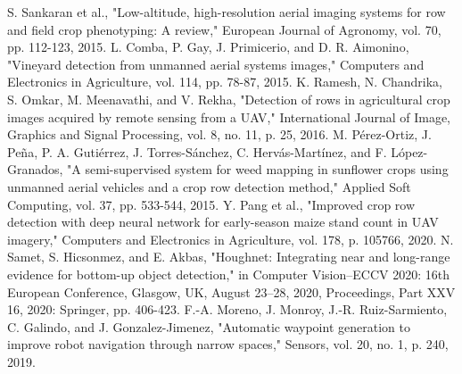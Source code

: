 \documentclass[conference]{IEEEtran}
\begin{document}
\begin{thebibliography}{00}
		 S. Sankaran et al., "Low-altitude, high-resolution aerial imaging systems for row and field crop phenotyping: A review," European Journal of Agronomy, vol. 70, pp. 112-123, 2015.
		 L. Comba, P. Gay, J. Primicerio, and D. R. Aimonino, "Vineyard detection from unmanned aerial systems images," Computers and Electronics in Agriculture, vol. 114, pp. 78-87, 2015.
		 K. Ramesh, N. Chandrika, S. Omkar, M. Meenavathi, and V. Rekha, "Detection of rows in agricultural crop images acquired by remote sensing from a UAV," International Journal of Image, Graphics and Signal Processing, vol. 8, no. 11, p. 25, 2016.
		 M. Pérez-Ortiz, J. Peña, P. A. Gutiérrez, J. Torres-Sánchez, C. Hervás-Martínez, and F. López-Granados, "A semi-supervised system for weed mapping in sunflower crops using unmanned aerial vehicles and a crop row detection method," Applied Soft Computing, vol. 37, pp. 533-544, 2015.
		 Y. Pang et al., "Improved crop row detection with deep neural network for early-season maize stand count in UAV imagery," Computers and Electronics in Agriculture, vol. 178, p. 105766, 2020.
		 N. Samet, S. Hicsonmez, and E. Akbas, "Houghnet: Integrating near and long-range evidence for bottom-up object detection," in Computer Vision–ECCV 2020: 16th European Conference, Glasgow, UK, August 23–28, 2020, Proceedings, Part XXV 16, 2020: Springer, pp. 406-423.
		 F.-A. Moreno, J. Monroy, J.-R. Ruiz-Sarmiento, C. Galindo, and J. Gonzalez-Jimenez, "Automatic waypoint generation to improve robot navigation through narrow spaces," Sensors, vol. 20, no. 1, p. 240, 2019.
	\end{thebibliography}
	
	\vspace{12pt}
	
	
\end{document}
